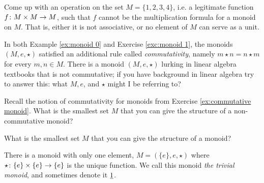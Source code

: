 \begin{exerciseRUS}\label{exc:monoid 1}
\end{exerciseRUS}

\begin{exerciseENG}
Come up with an operation on the set $M=\{1,2,3,4\}$, i.e. a legitimate function $f\colon M\times M\rightarrow M$, such that $f$ cannot be the multiplication formula for a monoid on $M$. That is, either it is not associative, or no element of $M$ can serve as a unit.
\end{exerciseENG}

\begin{exerciseRUS}
\end{exerciseRUS}

\begin{exerciseENG}\label{ex:commutative monoid}
In both Example \ref{ex:monoid 0} and Exercise \ref{exc:monoid 1}, the monoids $(M,e,\star)$ satisfied an additional rule called {\em commutativity}, namely $m\star n=n\star m$ for every $m,n\in M$. There is a monoid $(M,e,\star)$ lurking in linear algebra textbooks that is not commutative; if you have background in linear algebra try to answer this: what $M, e$, and $\star$ might I be referring to?
\end{exerciseENG}

\begin{exerciseRUS}\label{ex:commutative monoid}
\end{exerciseRUS}

\begin{exerciseENG}
Recall the notion of commutativity for monoids from Exercise \ref{ex:commutative monoid}. 
\sexc What is the smallest set $M$ that you can give the structure of a non-commutative monoid? 
\item What is the smallest set $M$ that you can give the structure of a monoid?
\endsexc
\end{exerciseENG}

\begin{exerciseRUS}
\end{exerciseRUS}

\begin{exampleENG}\label{ex:trivial monoid}
There is a monoid with only one element, $M=(\{e\},e,\star)$ where $\star\colon\{e\}\times\{e\}\rightarrow\{e\}$ is the unique function. We call this monoid {\em the trivial monoid}, and sometimes denote it $\underline{1}$.
\end{exampleENG}

